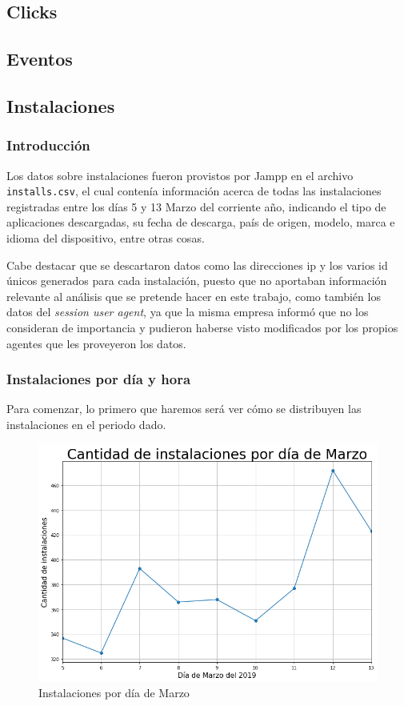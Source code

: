 \documentclass[a4paper, 12pt]{article}
\begin{document}
\subsection{Clicks}

\subsection{Eventos}

\subsection{Instalaciones}
	\subsubsection{Introducción}
		Los datos sobre instalaciones fueron provistos por Jampp en el archivo \texttt{installs.csv}, el cual contenía información acerca de todas las instalaciones registradas entre los días 5 y 13  Marzo del corriente año, indicando el tipo de aplicaciones descargadas, su fecha de descarga, país de origen, modelo, marca e idioma del dispositivo, entre otras cosas. 
	
		Cabe destacar que se descartaron datos como las direcciones ip y los varios id únicos generados para cada instalación, puesto que no aportaban información relevante al análisis que se pretende hacer en este trabajo, como también los datos del \textit{session user agent}, ya que la misma empresa informó que no los consideran de importancia y pudieron haberse visto modificados por los propios agentes que les proveyeron los datos.
	
	\subsubsection{Instalaciones por día y hora}
		Para comenzar, lo primero que haremos será ver cómo se distribuyen las instalaciones en el periodo dado. 
		\FloatBarrier
		\begin{figure}[h]
			\centering
			\includegraphics[width=\textwidth]{images/installs/installspordia.png}
			\caption{Instalaciones por día de Marzo}
		\end{figure}
		\FloatBarrier
		
\end{document}
